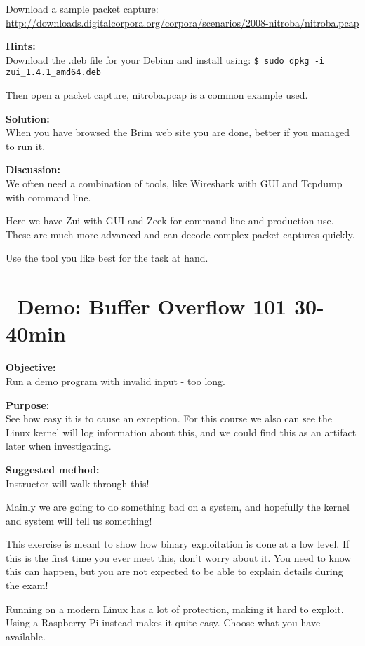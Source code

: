 \documentclass[a4paper,11pt,notitlepage]{report}
\begin{document}
Download a sample packet capture:\\
\url{http://downloads.digitalcorpora.org/corpora/scenarios/2008-nitroba/nitroba.pcap}


{\bf Hints:}\\
Download the .deb file for your Debian and install using:
\verb+$ sudo dpkg -i zui_1.4.1_amd64.deb+

Then open a packet capture, nitroba.pcap is a common example used.

{\bf Solution:}\\
When you have browsed the Brim web site you are done, better if you managed to run it.

{\bf Discussion:}\\
We often need a combination of tools, like Wireshark with GUI and Tcpdump with command line.

Here we have Zui with GUI and Zeek for command line and production use. These are much more advanced and can decode complex packet captures quickly.

Use the tool you like best for the task at hand.



\chapter{\faInfoCircle\ Demo: Buffer Overflow 101 30-40min}
\label{ex:bufferoverflow}


{\bf Objective:}\\
Run a demo program with invalid input - too long.

{\bf Purpose:}\\
See how easy it is to cause an exception. For this course we also can see the Linux kernel will log information about this, and we could find this as an artifact later when investigating.

{\bf Suggested method:}\\
Instructor will walk through this!

{\Large
Mainly we are going to do something bad on a system, and hopefully the kernel and system will tell us something!

This exercise is meant to show how binary exploitation is done at a low level. If this is the first time you ever meet this, don't worry about it. You need to know this can happen, but you are not expected to be able to explain details during the exam!}

Running on a modern Linux has a lot of protection, making it hard to exploit. Using a Raspberry Pi instead makes it quite easy. Choose what you have available.
\end{document}
